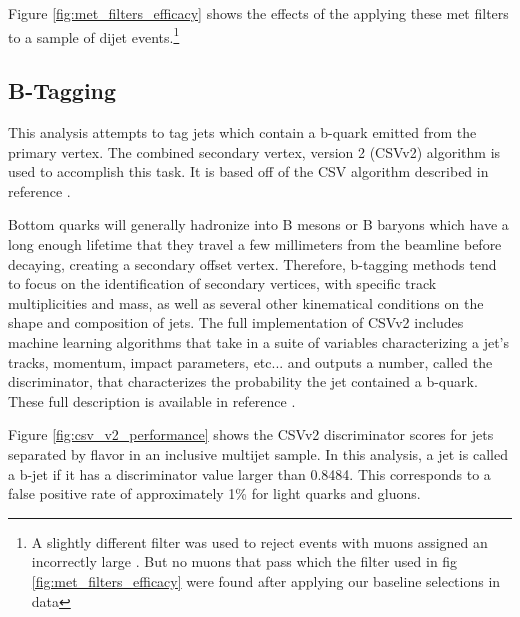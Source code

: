     Figure \ref{fig:met_filters_efficacy} shows the effects of the applying these met filters to a sample of dijet events.\footnote{A slightly different filter was used to reject events with muons assigned an incorrectly large \pt. But no muons that pass which the filter used in fig \ref{fig:met_filters_efficacy} were found after applying our baseline selections in data}

  \subsection{B-Tagging} \label{sec:b-tagging}
    This analysis attempts to tag jets which contain a b-quark emitted from the primary vertex. The combined secondary vertex, version 2 (CSVv2) algorithm  is used to accomplish this task. It is based off of the CSV algorithm described in reference \cite{btag_csv}. 

    Bottom quarks will generally hadronize into B mesons or B baryons which have a long enough lifetime that they travel a few millimeters from the beamline before decaying, creating a secondary offset vertex. Therefore, b-tagging methods tend to focus on the identification of secondary vertices, with specific track multiplicities and mass, as well as several other kinematical conditions on the shape and composition of jets\cite{btag_strassler}. The full implementation of CSVv2 includes machine learning algorithms that take in a suite of variables characterizing a jet's tracks, momentum, impact parameters, etc... and outputs a number, called the discriminator, that characterizes the probability the jet contained a b-quark. These full description is available in reference \cite[section 5.1.2]{cms_heavy_tagging}. 

    Figure \ref{fig:csv_v2_performance} shows the CSVv2 discriminator scores for jets separated by flavor in an inclusive multijet sample. In this analysis, a jet is called a b-jet if it has a discriminator value larger than 0.8484. This corresponds to a false positive rate of approximately 1\% for light quarks and gluons. 

